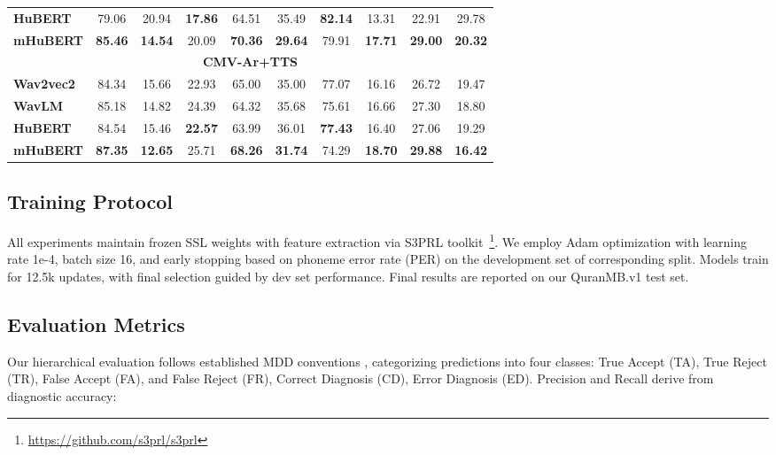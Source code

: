 \documentclass{Interspeech}
\begin{document}
\begin{table}[]
{\begin{tabular}{lcc|ccc|cccc}
      \textbf{HuBERT}     & 79.06 & 20.94 & \textbf{17.86} & 64.51 & 35.49 & \textbf{82.14} & 13.31 & 22.91 & 29.78 \\
      \textbf{mHuBERT}    & \textbf{85.46} & \textbf{14.54} & 20.09 & \textbf{70.36} & \textbf{29.64} & 79.91 & \textbf{17.71} & \textbf{29.00} & \textbf{20.32} \\
      \midrule
      \multicolumn{10}{c}{\textbf{CMV-Ar+TTS}} \\ 
      \midrule
      \textbf{Wav2vec2}   & 84.34 & 15.66 & 22.93 & 65.00 & 35.00 & 77.07 & 16.16 & 26.72 & 19.47 \\
      \textbf{WavLM}      & 85.18 & 14.82 & 24.39 & 64.32 & 35.68 & 75.61 & 16.66 & 27.30 & 18.80 \\
      \textbf{HuBERT}     & 84.54 & 15.46 & \textbf{22.57} & 63.99 & 36.01 & \textbf{77.43} & 16.40 & 27.06 & 19.29 \\
      \textbf{mHuBERT}    & \textbf{87.35} & \textbf{12.65} & 25.71 & \textbf{68.26} & \textbf{31.74} & 74.29 & \textbf{18.70} & \textbf{29.88} & \textbf{16.42} \\
      \bottomrule
    \end{tabular}
  }
\end{table}


\subsection{Training Protocol}
All experiments maintain frozen SSL weights with feature extraction via S3PRL toolkit~\cite{s3prl1,superb}\footnote{\url{https://github.com/s3prl/s3prl}}. We employ Adam optimization with learning rate 1e-4, batch size 16, and early stopping based on phoneme error rate (PER) on the development set of corresponding split. Models train for 12.5k updates, with final selection guided by dev set performance. Final results are reported on our QuranMB.v1 test set.

\subsection{Evaluation Metrics}
\label{sec:evaluation}

Our hierarchical evaluation follows established MDD conventions \cite{leung2019cnn, li2016mispronunciation}, categorizing predictions into four classes: True Accept (TA), True Reject (TR), False Accept (FA), and False Reject (FR), Correct Diagnosis (CD), Error Diagnosis (ED). Precision and Recall derive from diagnostic accuracy:
\end{document}
